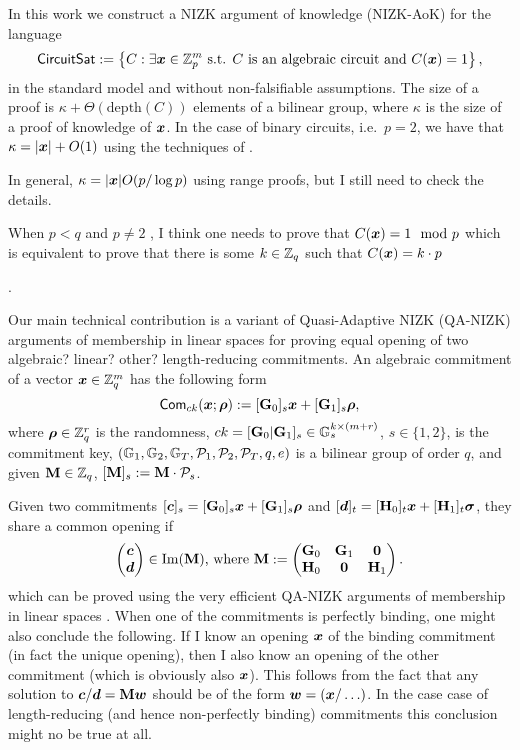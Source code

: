 
In this work we construct a NIZK argument of knowledge (NIZK-AoK) for the language
\[
\mathsf{CircuitSat}:=\left\{
	C : \exists {\boldsymbol{x}}\in\mathbb{Z}_p^m \text{ s.t. } C \text{ is an algebraic circuit and } C({\boldsymbol{x}})=1
	\right\},
\]
in the standard model and without non-falsifiable assumptions.
The size of a proof is $\kappa+\Theta(\mathrm{depth}(C))$ elements of a bilinear group, where $\kappa$ is the size of a proof of knowledge of ${\boldsymbol{x}}$. In the case of binary circuits, i.e.~$p=2$, we have that $\kappa=|{\boldsymbol{x}}|+O(1)$ using the techniques of \cite{AC:GonHevRaf15}. {\color{red} In general, $\kappa=|{\boldsymbol{x}}|O(p/\log p)$ using range proofs, but I still need to check the details.

When $p< q$ and $p\neq 2$ , I think one needs to prove that $C({\boldsymbol{x}}) = 1 \mod p$ which is equivalent to prove that there is some $k\in\mathbb{Z}_q$ such that $C({\boldsymbol{x}}) = k\cdot p$}.

Our main technical contribution is a variant of Quasi-Adaptive NIZK (QA-NIZK) arguments of membership in linear spaces \cite{AC:JutRoy13,C:LPJY13,C:JutRoy14,EC:AbdBenPoi15,EC:KilWee15,AC:GonHevRaf15} for proving equal opening of two {\color{red}algebraic? linear? other?} length-reducing commitments.
An algebraic commitment of a vector ${\boldsymbol{x}}\in\mathbb{Z}_q^m$ has the following form
$$\mathsf{Com}_{ck}({\boldsymbol{x}};{\boldsymbol{\rho}}) := [\mathbf{{G}}_0]_s{\boldsymbol{x}}+[\mathbf{{G}}_1]_s{\boldsymbol{\rho}},$$
where ${\boldsymbol{\rho}}\in\mathbb{Z}_q^r$ is the randomness, $ck=[\mathbf{{G}}_0|\mathbf{{G}}_1]_s\in\mathbb{G}_s^{k\times(m+r)}$, $s\in\{1,2\}$, is the commitment key, $(\mathbb{G}_1,\mathbb{G}_2,\mathbb{G}_T,\mathcal{P}_1,\mathcal{P}_2,\mathcal{P}_T,q,e)$ is a bilinear group of order $q$, and given $\mathbf{{M}}\in\mathbb{Z}_q$, $[\mathbf{{M}}]_s:=\mathbf{{M}}\cdot \mathcal{P}_s$.

Given two commitments $[{\boldsymbol{c}}]_s=[\mathbf{{G}}_0]_s{\boldsymbol{x}}+[\mathbf{{G}}_1]_s{\boldsymbol{\rho}}$ and $[{\boldsymbol{d}}]_t=[\mathbf{{H}}_0]_t{\boldsymbol{x}}+[\mathbf{{H}}_1]_t{\boldsymbol{\sigma}}$, they share a common opening if
$$
\begin{pmatrix}{\boldsymbol{c}}\\{\boldsymbol{d}}\end{pmatrix} \in
\mathrm{Im}(\mathbf{{M}})\text{, where }\mathbf{{M}}:=
\begin{pmatrix}
\mathbf{{G}}_0 & \mathbf{{G}}_1 & \mathbf{{0}}\\
\mathbf{{H}}_0 & \mathbf{{0}}     & \mathbf{{H}}_1
\end{pmatrix}.
$$
which can be proved using the very efficient QA-NIZK arguments of membership in linear spaces \cite{C:JutRoy14,EC:KilWee15,AC:GonHevRaf15}.
When one of the commitments is perfectly binding, one might also conclude the following. If I know an opening ${\boldsymbol{x}}$ of the binding commitment (in fact the unique opening), then I also know an opening of the other commitment (which is obviously also ${\boldsymbol{x}}$). This follows from the fact that any solution to ${\boldsymbol{c}}/{\boldsymbol{d}}=\mathbf{{M}}{\boldsymbol{w}}$ should be of the form ${\boldsymbol{w}}=({\boldsymbol{x}}/\ldots)$. In the case case of length-reducing (and hence non-perfectly binding) commitments this conclusion might no be true at all.

